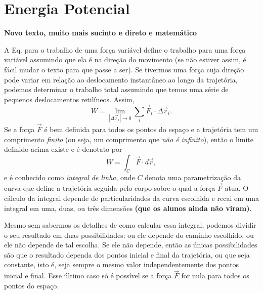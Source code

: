 
\section{Energia Potencial}

\textbf{Novo texto, muito mais sucinto e direto e matemático}

A Eq. para o trabalho de uma força variável define o trabalho para uma força variável assumindo que ela é na direção do movimento (se não estiver assim, é fácil mudar o texto para que passe a ser). Se tivermos uma força cuja direção pode variar em relação ao deslocamento instantâneo ao longo da trajetória, podemos determinar o trabalho total assumindo que temos uma série de pequenos deslocamentos retilíneos. Assim,
\begin{equation}
    W = \lim_{|\Delta\vec{r}_i| \to 0} \sum_i \vec{F}_i\cdot\Delta\vec{r}_i.
\end{equation}
%
Se a força $\vec{F}$ é bem definida para todos os pontos do espaço e a trajetória tem um comprimento \emph{finito} (ou seja, um comprimento que \emph{não é infinito}), então o limite definido acima existe e é denotato por
\begin{equation}
    W = \int_C \vec{F}\cdot d\vec{r},
\end{equation}
%
e é conhecido como \emph{integral de linha}, onde $C$ denota uma parametrização da curva que define a trajetória seguida pelo corpo sobre o qual a força $\vec{F}$ atua. O cálculo da integral depende de particularidades da curva escolhida e recai em uma integral em uma, duas, ou três dimensões \textbf{(que os alunos ainda não viram)}. 

Mesmo sem sabermos os detalhes de como calcular essa integral, podemos dividir o seu resultado em duas possibilidades: ou ele depende do caminho escolhido, ou ele não depende de tal escolha. Se ele não depende, então as únicas possibilidades são que o resultado dependa dos pontos inicial e final da trajetória, ou que seja constante, isto é, seja sempre o mesmo valor independentemente dos pontos inicial e final. Esse último caso só é possível se a força $\vec{F}$ for nula para todos os pontos do espaço.

